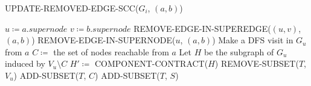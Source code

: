 \begin{algorithm}[H]
    \caption{UPDATE-REMOVED-EDGE-SCC($G_i$, $(a, b)$)}\label{alg:remove-edge-scc}
    \begin{algorithmic}[1]
        \State $u \coloneqq a.supernode$
        \State $v \coloneqq b.supernode$
            \State REMOVE-EDGE-IN-SUPEREDGE($(u, v)$, $(a, b)$)
        \Else
            \State REMOVE-EDGE-IN-SUPERNODE($u$, $(a, b)$)
            \State Make a DFS visit in $G_u$ from $a$
            \State $C \coloneqq $ the set of nodes reachable from $a$
                \State Let $H$ be the subgraph of $G_u$ induced by $V_u \setminus C$
                \State $H' \coloneqq$ COMPONENT-CONTRACT($H$)
                \State REMOVE-SUBSET($T$, $V_u$)
                \State ADD-SUBSET($T$, $C$)
                    \State ADD-SUBSET($T$, $S$)
                \EndFor
            \EndIf
        \EndIf
    \end{algorithmic}
\end{algorithm}